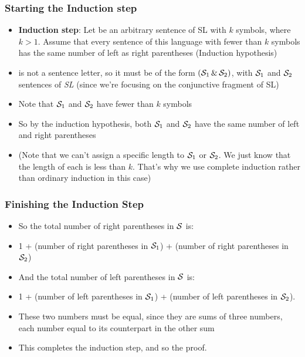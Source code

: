 \begin{frame}
\frametitle{Starting the Induction step}
\begin{itemize}[<+->]
\item {\bf{Induction step}}: Let  be an arbitrary sentence of SL with $k$ symbols, where $k>1$. Assume that  every sentence of this language with fewer than $k$ symbols has the same number of left as right parentheses (Induction hypothesis)

\item {} is not a sentence letter, so it must be of the form $(\mathcal{S}_1 \,\&\, \mathcal{S}_2)$, with $\mathcal{S}_1$ and $\mathcal{S}_2$ sentences of {\it{SL}} (since we're focusing on the conjunctive fragment of SL)

\item Note that $\mathcal{S}_1$ and $\mathcal{S}_2$ have fewer than $k$ symbols 

\item So by the induction hypothesis, both $\mathcal{S}_1$ and $\mathcal{S}_2$ have the same number of left and right parentheses

\item (Note that we can't assign a specific length to $\mathcal{S}_1$ or $\mathcal{S}_2$. We just know that the length of each is less than $k$. That's why we use complete induction rather than ordinary induction in this case)

\end{itemize} 
\end{frame}

\begin{frame}
\frametitle{Finishing the Induction Step}

\begin{itemize}[<+->]
\item So the total number of right parentheses in $\mathcal{S}$ is:

\item[] 1 + (number of right parentheses in $\mathcal{S}_1$) + (number of right parentheses in $\mathcal{S}_2$)

\item And the total number of left parentheses in $\mathcal{S}$ is:

\item[] 1 + (number of left parentheses in $\mathcal{S}_1$) + (number of left parentheses in $\mathcal{S}_2$).

\item These two numbers must be equal, since they are sums of three numbers, each number equal to its counterpart in the other sum

\item This completes the induction step, and so the proof.

\end{itemize} 
\end{frame}

